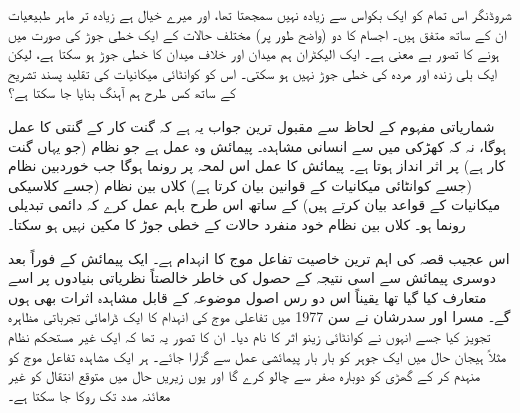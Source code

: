 شروڈنگر اس تمام کو ایک بکواس سے زیادہ نہیں سمجھتا تھا، اور میرے خیال ہے  زیادہ تر ماہر طبیعیات ان  کے ساتھ متفق ہیں۔   اجسام کا دو  (واضح طور پر)  مختلف حالات کے  ایک خطی جوڑ کی صورت میں ہونے کا تصور بے معنی ہے۔ ایک الیکٹران  ہم میدان اور خلاف میدان کا  خطی جوڑ  ہو سکتا ہے،  لیکن ایک بلی زندہ اور مردہ  کی  خطی جوڑ  نہیں ہو سکتی۔ اس کو کوانٹائی میکانیات کی تقلید پسند تشریح کے ساتھ کس طرح ہم آہنگ بنایا جا سکتا ہے؟

شماریاتی مفہوم کے لحاظ سے مقبول ترین جواب یہ ہے کہ گنت کار کے گنتی کا عمل      ہوگا،  نہ کہ کھڑکی میں سے انسانی مشاہدہ۔  پیمائش  وہ  عمل ہے جو    نظام (جو یہاں گنت کار ہے)   پر اثر انداز ہوتا ہے۔ پیمائش کا عمل اس لمحہ پر رونما ہوگا جب خوردبین نظام  (جسے کوانٹائی میکانیات کے قوانین بیان کرتا ہے)  کلاں بین نظام  (جسے کلاسیکی میکانیات کے قواعد بیان کرتے ہیں)  کے ساتھ اس طرح باہم عمل کرے کہ  دائمی تبدیلی رونما ہو۔ کلاں بین نظام خود منفرد حالات کے   خطی جوڑ کا مکین نہیں ہو سکتا۔

اس عجیب قصہ کی اہم ترین خاصیت تفاعل موج کا انہدام ہے۔ ایک پیمائش کے فوراً بعد دوسری پیمائش سے اسی نتیجہ کے حصول کی خاطر خالصتاً نظریاتی بنیادوں پر اسے متعارف کیا گیا تھا یقیناً اس دو رس  اصول موضوعہ کے قابل مشاہدہ اثرات بھی ہوں گے۔ مسرا اور سدرشان نے سن \num{1977} میں تفاعلی موج کی انہدام کا ایک ڈرامائی تجرباتی مظاہرہ تجویز کیا جسے انہوں نے کوانٹائی زینو اثر کا نام دیا۔ ان کا تصور یہ تھا کہ ایک غیر مستحکم نظام مثلاً ہیجان حال میں ایک جوہر کو بار بار پیمائشی عمل سے گزارا جائے۔ ہر ایک مشاہدہ تفاعل موج کو منہدم کر کے گھڑی کو دوبارہ صفر  سے چالو کرے گا اور یوں زیریں حال میں متوقع  انتقال کو غیر معائنہ مدد تک روکا جا سکتا ہے۔

